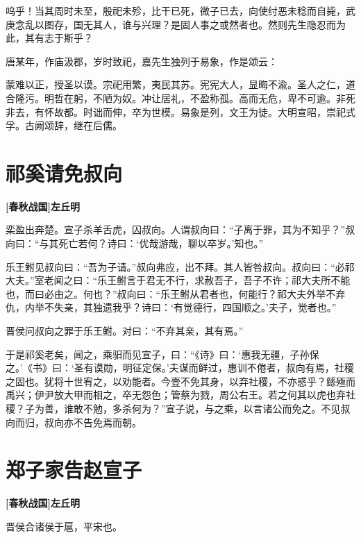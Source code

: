 \documentclass[UTF8,titlepage,oneside]{ctexbook}
\begin{document}
呜乎！当其周时未至，殷祀未殄，比干已死，微子已去，向使纣恶未稔而自毙，武庚念乱以图存，国无其人，谁与兴理？是固人事之或然者也。然则先生隐忍而为此，其有志于斯乎？


唐某年，作庙汲郡，岁时致祀，嘉先生独列于易象，作是颂云：


蒙难以正，授圣以谟。宗祀用繁，夷民其苏。宪宪大人，显晦不渝。圣人之仁，道合隆污。明哲在躬，不陋为奴。冲让居礼，不盈称孤。高而无危，卑不可逾。非死非去，有怀故都。时诎而伸，卒为世模。易象是列，文王为徒。大明宣昭，崇祀式孚。古阙颂辞，继在后儒。



\chapter*{祁奚请免叔向}
\begin{center}
	\textbf{[春秋战国]左丘明}
\end{center}


栾盈出奔楚。宣子杀羊舌虎，囚叔向。人谓叔向曰：“子离于罪，其为不知乎？”叔向曰：“与其死亡若何？诗曰：‘优哉游哉，聊以卒岁。’知也。”


乐王鲋见叔向曰：“吾为子请。”叔向弗应，出不拜。其人皆咎叔向。叔向曰：“必祁大夫。”室老闻之曰：“乐王鲋言于君无不行，求赦吾子，吾子不许；祁大夫所不能也，而曰必由之。何也？”叔向曰：“乐王鲋从君者也，何能行？祁大夫外举不弃仇，内举不失亲，其独遗我乎？诗曰：‘有觉德行，四国顺之。’夫子，觉者也。”


晋侯问叔向之罪于乐王鲋。对曰：“不弃其亲，其有焉。”


于是祁奚老矣，闻之，乘驲而见宣子，曰：“《诗》曰：‘惠我无疆，子孙保之。’《书》曰：‘圣有谟勋，明征定保。’夫谋而鲜过，惠训不倦者，叔向有焉，社稷之固也。犹将十世宥之，以劝能者。今壹不免其身，以弃社稷，不亦惑乎？鲧殛而禹兴；伊尹放大甲而相之，卒无怨色；管蔡为戮，周公右王。若之何其以虎也弃社稷？子为善，谁敢不勉，多杀何为？”宣子说，与之乘，以言诸公而免之。不见叔向而归，叔向亦不告免焉而朝。



\chapter*{郑子家告赵宣子}
\begin{center}
	\textbf{[春秋战国]左丘明}
\end{center}


晋侯合诸侯于扈，平宋也。
\end{document}

